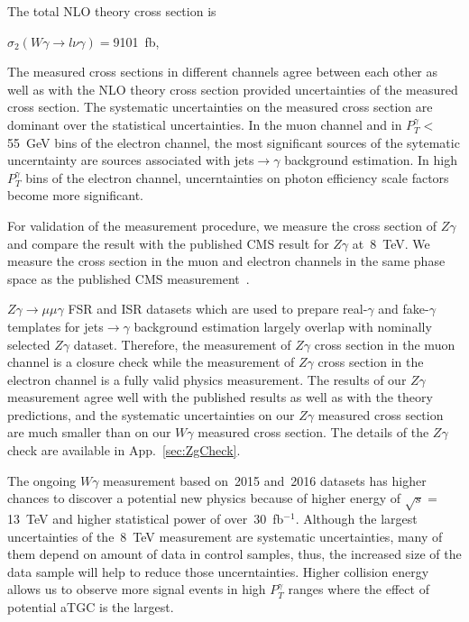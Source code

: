 The total NLO theory cross section is 

\begin{center}
$\sigma_2(W\gamma\rightarrow l\nu\gamma)=$9101~fb,
\end{center}


The measured cross sections in different channels agree between each other as well as with the NLO theory cross section provided uncertainties of the measured cross section. The systematic uncertainties on the measured cross section are dominant over the statistical uncertainties. In the muon channel and in $P_T^{\gamma}<$55~GeV bins of the electron channel, the most significant sources of the sytematic uncerntainty are sources associated with jets$\rightarrow\gamma$ background estimation. In high $P_T^{\gamma}$ bins of the electron channel, uncerntainties on photon efficiency scale factors become more significant.

For validation of the measurement procedure, we measure the cross section of $Z\gamma$ and compare the result with the published CMS result for $Z\gamma$ at~8~TeV. We measure the cross section in the muon and electron channels in the same phase space as the published CMS measurement~\cite{ref_Zg8TeV}. 

$Z\gamma\rightarrow\mu\mu\gamma$ FSR and ISR datasets which are used to prepare real-$\gamma$ and fake-$\gamma$ templates for jets$\rightarrow\gamma$ background estimation largely overlap with nominally selected $Z\gamma$ dataset. Therefore, the measurement of $Z\gamma$ cross section in the muon channel is a closure check while the measurement of $Z\gamma$ cross section in the electron channel is a fully valid physics measurement. The results of our $Z\gamma$ measurement agree well with the published results as well as with the theory predictions, and the systematic uncertainties on our $Z\gamma$ measured cross section are much smaller than on our $W\gamma$ measured cross section. The details of the $Z\gamma$ check are available in App.~\ref{sec:ZgCheck}.

The ongoing $W\gamma$ measurement based on~2015 and~2016 datasets has higher chances to discover a potential new physics because of higher energy of $\sqrt{s}=$13~TeV and higher statistical power of over~30~fb$^{-1}$. Although the largest uncertainties of the~8~TeV measurement are systematic uncertainties, many of them depend on amount of data in control samples, thus, the increased size of the data sample will help to reduce those uncerntainties. Higher collision energy allows us to observe more signal events in high $P_T^{\gamma}$ ranges where the effect of potential aTGC is the largest. 

